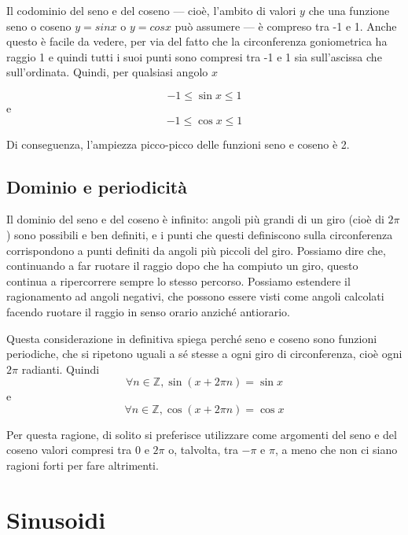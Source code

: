 Il codominio del seno e del coseno --- cioè, l'ambito di valori $y$ che una funzione seno o coseno $y = sin x$ o $y = cos x$ può assumere --- è compreso tra -1 e 1. Anche questo è facile da vedere, per via del fatto che la circonferenza goniometrica ha raggio 1 e quindi tutti i suoi punti sono compresi tra -1 e 1 sia sull'ascissa che sull'ordinata. Quindi, per qualsiasi angolo $x$

\begin{equation}
-1 \leq \sin x \leq 1
\end{equation}
e
\begin{equation}
-1 \leq \cos x \leq 1
\end{equation}

Di conseguenza, l'ampiezza picco-picco delle funzioni seno e coseno è 2.


\subsection{Dominio e periodicità}

Il dominio del seno e del coseno è infinito: angoli più grandi di un giro (cioè di $2\pi$) sono possibili e ben definiti, e i punti che questi definiscono sulla circonferenza corrispondono a punti definiti da angoli più piccoli del giro. Possiamo dire che, continuando a far ruotare il raggio dopo che ha compiuto un giro, questo continua a ripercorrere sempre lo stesso percorso. Possiamo estendere il ragionamento ad angoli negativi, che possono essere visti come angoli calcolati facendo ruotare il raggio in senso orario anziché antiorario.

Questa considerazione in definitiva spiega perché seno e coseno sono funzioni periodiche, che si ripetono uguali a sé stesse a ogni giro di circonferenza, cioè ogni $2 \pi$ radianti. Quindi
\begin{equation}
\forall n \in \mathbb{Z}, \sin(x + 2 \pi n) = \sin x
\end{equation}
e
\begin{equation}
\forall n \in \mathbb{Z}, \cos(x + 2 \pi n) = \cos x
\end{equation}

Per questa ragione, di solito si preferisce utilizzare come argomenti del seno e del coseno valori compresi tra 0 e $2 \pi$ o, talvolta, tra $-\pi$ e $\pi$, a meno che non ci siano ragioni forti per fare altrimenti.





\section{Sinusoidi}

